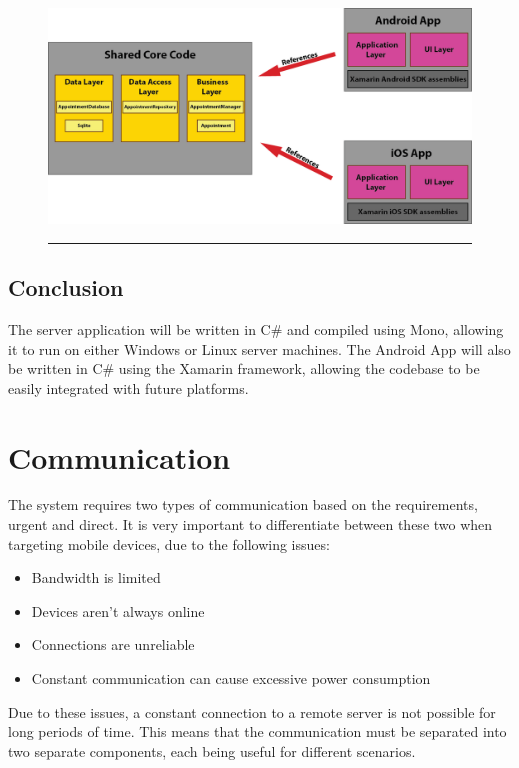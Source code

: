 \begin{figure}[htbp]
	\centering
		\includegraphics[width=\textwidth,height=\textheight,keepaspectratio]{Figures/AppOverview.png}
		\rule{35em}{0.5pt}
\end{figure}

\subsection{Conclusion} 

The server application will be written in C\# and compiled using Mono, allowing it to run on either Windows or Linux server machines. The Android App will also be written in C\# using the Xamarin framework, allowing the codebase to be easily integrated with future platforms.


\section{Communication}

The system requires two types of communication based on the requirements, urgent and direct. It is very important to differentiate between these two when targeting mobile devices, due to the following issues:
\begin{itemize}
	\item Bandwidth is limited
	\item Devices aren't always online
	\item Connections are unreliable
	\item Constant communication can cause excessive power consumption
\end{itemize}

Due to these issues, a constant connection to a remote server is not possible for long periods of time. This means that the communication must be separated into two separate components, each being useful for different scenarios.

